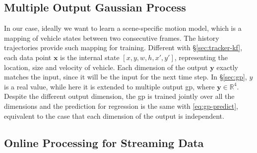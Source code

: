 \subsection{Multiple Output Gaussian Process}

In our case, ideally we want to learn a scene-specific motion model, which is a mapping of vehicle states between two consecutive frames. 
The history trajectories provide such mapping for training. 
Different with \S\ref{sec:tracker-kf}, each data point $\mathbf{x}$ is the internal state $[x, y, w, h, x', y']$, 
representing the location, size and velocity of vehicle. 
Each dimension of the output $\mathbf{y}$ exactly matches the input, since it will be the input for the next time step.
In \S\ref{sec:gp}, $y$ is a real value, while here it is extended to multiple output \gls{gp}, where $\mathbf{y} \in \mathbb{R}^{4}$. 
Despite the different output dimension, the \gls{gp} is trained jointly over all the dimensions and the prediction for regression is the same with \ref{eq:gp-predict}, equivalent to the case that each dimension of the output is independent.

\subsection{Online Processing for Streaming Data}



